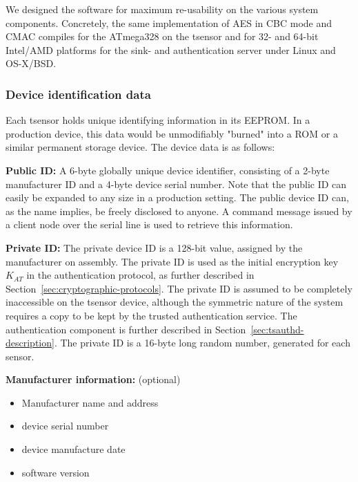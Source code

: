 We designed the software for maximum re-usability on the various system components. Concretely, the same implementation of AES in CBC mode and CMAC compiles for the ATmega328 on the tsensor and for 32- and 64-bit Intel/AMD platforms for the sink- and authentication server under Linux and OS-X/BSD.

\subsubsection{Device identification data}

Each tsensor holds unique identifying information in its EEPROM. In a production device, this data would be unmodifiably "burned" into a ROM or a similar permanent storage device. The device data is as follows:
%
\begin{description}

\item \textbf{Public ID:} A 6-byte globally unique device identifier, consisting of a 2-byte manufacturer ID and a 4-byte device serial number. Note that the public ID can easily be expanded to any size in a production setting. The public device ID can, as the name implies, be freely disclosed to anyone. A command message issued by a client node over the serial line is used to retrieve this information.

\item \textbf{Private ID:} The private device ID is a 128-bit value, assigned by the manufacturer on assembly. The private ID is used as the initial encryption key $K_{AT}$ in the authentication protocol, as further described in Section~\ref{sec:cryptographic-protocols}. The private ID is assumed to be completely inaccessible on the tsensor device, although the symmetric nature of the system requires a copy to be kept by the trusted authentication service. The authentication component is further described in Section~\ref{sec:tsauthd-description}. The private ID is a 16-byte long random number, generated for each sensor.

\item \textbf{Manufacturer information:} (optional)
\begin{itemize}
\item Manufacturer name and address
\item device serial number
\item device manufacture date
\item software version
\end{itemize}
\end{description}

